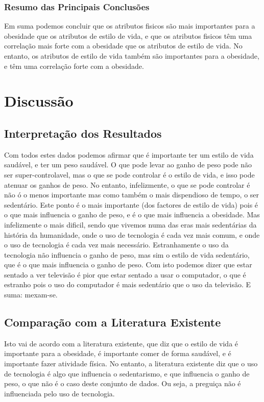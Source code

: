 \documentclass{easychair}
\begin{document}
\subsubsection{Resumo das Principais Conclusões}

Em suma podemos concluir que os atributos fisicos são mais importantes para a obesidade que os atributos de estilo de vida, e que os atributos fisicos têm uma correlação mais forte com a obesidade que os atributos de estilo de vida. No entanto, os atributos de estilo de vida também são importantes para a obesidade, e têm uma correlação forte com a obesidade.

\section{Discussão}
\subsection{Interpretação dos Resultados}

Com todos estes dados podemos afirmar que é importante ter um estilo de vida saudável, e ter um peso saudável. O que pode levar ao ganho de peso pode não ser super-controlavel, mas o que se pode controlar é o estilo de vida, e isso pode atenuar os ganhos de peso. No entanto, infelizmente, o que se pode controlar é não ó o menos importante mas como também o mais dispendioso de tempo, o ser sedentário. Este ponto é o mais importante (dos factores de estilo de vida) pois é o que mais influencia o ganho de peso, e é o que mais influencia a obesidade. Mas infelizmente o mais dificil, sendo que vivemos numa das eras mais sedentárias da história da humanidade, onde o uso de tecnologia é cada vez mais comum, e onde o uso de tecnologia é cada vez mais necessário. Estranhamente o uso da tecnologia não influencia o ganho de peso, mas sim o estilo de vida sedentário, que é o que mais influencia o ganho de peso. Com isto podemos dizer que estar sentado a ver televisão é pior que estar sentado a usar o computador, o que é estranho pois o uso do computador é mais sedentário que o uso da televisão. E suma: mexam-se.

\subsection{Comparação com a Literatura Existente}

Isto vai de acordo com a literatura existente, que diz que o estilo de vida é importante para a obesidade, é importante comer de forma saudável, e é importante fazer atividade física. No entanto, a literatura existente diz que o uso de tecnologia é algo que influencia o sedentarismo, e que influencia o ganho de peso, o que não é o caso deste conjunto de dados. Ou seja, a preguiça não é influenciada pelo uso de tecnologia.
\end{document}
